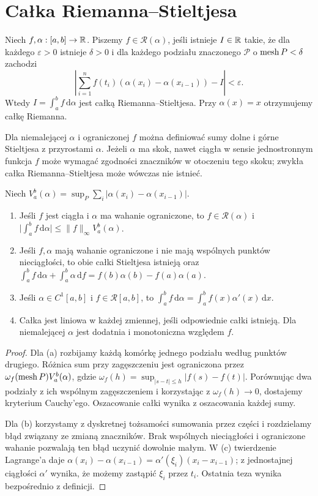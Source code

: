 \section{Całka Riemanna--Stieltjesa}
\begin{definicja}
Niech $f,\alpha:[a,b]\to\mathbb R$. Piszemy $f\in\mathcal R(\alpha)$, jeśli istnieje $I\in\mathbb R$ takie, że dla każdego $\varepsilon>0$ istnieje $\delta>0$ i dla każdego podziału znaczonego $\mathcal P$ o $\operatorname{mesh} P<\delta$ zachodzi
\[
\left|\sum_{i=1}^n f(t_i)(\alpha(x_i)-\alpha(x_{i-1}))-I\right|<\varepsilon.
\]
Wtedy $I=\int_a^b f\,\mathrm d\alpha$ jest całką Riemanna--Stieltjesa. Przy $\alpha(x)=x$ otrzymujemy całkę Riemanna.
\end{definicja}
\begin{uwaga}[Rozszerzenie]
Dla niemalejącej $\alpha$ i ograniczonej $f$ można definiować sumy dolne i górne Stieltjesa z przyrostami $\alpha$. Jeżeli $\alpha$ ma skok, nawet ciągła w sensie jednostronnym funkcja $f$ może wymagać zgodności znaczników w otoczeniu tego skoku; zwykła całka Riemanna--Stieltjesa może wówczas nie istnieć.
\end{uwaga}
\begin{twierdzenie}[Narzędzia]
Niech $V_a^b(\alpha)=\sup_P\sum_i|\alpha(x_i)-\alpha(x_{i-1})|$.
\begin{enumerate}[label=(\alph*)]
\item Jeśli $f$ jest ciągła i $\alpha$ ma wahanie ograniczone, to $f\in\mathcal R(\alpha)$ i $\bigl|\int_a^b f\,\mathrm d\alpha\bigr|\le\|f\|_\infty V_a^b(\alpha)$.
\item Jeśli $f,\alpha$ mają wahanie ograniczone i nie mają wspólnych punktów nieciągłości, to obie całki Stieltjesa istnieją oraz
$\int_a^b f\,\mathrm d\alpha+\int_a^b\alpha\,\mathrm df=f(b)\alpha(b)-f(a)\alpha(a)$.
\item Jeśli $\alpha\in C^1[a,b]$ i $f\in\mathcal R[a,b]$, to $\int_a^b f\,\mathrm d\alpha=\int_a^b f(x)\alpha'(x)\,\mathrm dx$.
\item Całka jest liniowa w każdej zmiennej, jeśli odpowiednie całki istnieją. Dla niemalejącej $\alpha$ jest dodatnia i monotoniczna względem $f$.
\end{enumerate}
\end{twierdzenie}
\begin{proof}
Dla (a) rozbijamy każdą komórkę jednego podziału według punktów drugiego. Różnica sum przy zagęszczeniu jest ograniczona przez $\omega_f(\operatorname{mesh} P)V_a^b(\alpha)$, gdzie $\omega_f(h)=\sup_{|s-t|\le h}|f(s)-f(t)|$. Porównując dwa podziały z ich wspólnym zagęszczeniem i korzystając z $\omega_f(h)\to0$, dostajemy kryterium Cauchy'ego. Oszacowanie całki wynika z oszacowania każdej sumy.

Dla (b) korzystamy z dyskretnej tożsamości sumowania przez części i rozdzielamy błąd związany ze zmianą znaczników. Brak wspólnych nieciągłości i ograniczone wahanie pozwalają ten błąd uczynić dowolnie małym. W (c) twierdzenie Lagrange'a daje $\alpha(x_i)-\alpha(x_{i-1})=\alpha'(\xi_i)(x_i-x_{i-1})$; z jednostajnej ciągłości $\alpha'$ wynika, że możemy zastąpić $\xi_i$ przez $t_i$. Ostatnia teza wynika bezpośrednio z definicji.
\end{proof}
